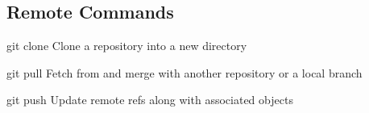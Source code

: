 \subsection{Remote Commands}
\begin{frame}[fragile]
\begin{block}{git clone}
Clone a repository into a new directory
\end{block}
\begin{block}{git pull}
Fetch from and merge with another repository or a local branch
\end{block}
\begin{block}{git push}
Update remote refs along with associated objects
\end{block}
\end{frame}

